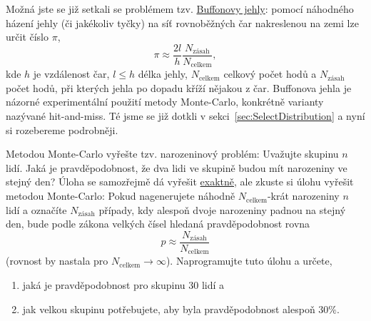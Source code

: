 \documentclass[a4paper,11pt,twoside]{article}
\theoremstyle{red}
\theoremstyle{green}
\begin{document}
    Možná jste se již setkali se problémem tzv. \href{https://cs.wikipedia.org/wiki/Buffonova_jehla}{Buffonovy jehly}: pomocí náhodného házení jehly (či jakékoliv tyčky) na síť rovnoběžných čar nakreslenou na zemi lze určit číslo $\pi$, 
    \begin{equation}
        \pi\approx\frac{2l}{h}\frac{N_{\text{zásah}}}{N_\text{celkem}},
    \end{equation}
    kde $h$ je vzdálenost čar, $l\leq h$ délka jehly, $N_{\text{celkem}}$ celkový počet hodů a $N_{\text{zásah}}$ počet hodů, při kterých jehla po dopadu kříží nějakou z čar.
    Buffonova jehla je názorné experimentální použití metody Monte-Carlo, konkrétně varianty nazývané hit-and-miss.
    Té jsme se již dotkli v sekci~\ref{sec:SelectDistribution} a nyní si rozebereme podrobněji.
    
    \begin{task}
        Metodou Monte-Carlo vyřešte tzv. narozeninový problém: Uvažujte skupinu $n$ lidí. 
        Jaká je pravděpodobnost, že dva lidi ve skupině budou mít narozeniny ve stejný den?
        Úloha se samozřejmě dá vyřešit \href{https://cs.wikipedia.org/wiki/Narozeninov%C3%BD_probl%C3%A9m}{exaktně}, ale zkuste si úlohu vyřešit metodou Monte-Carlo:
        Pokud nagenerujete náhodně $N_{\text{celkem}}$-krát narozeniny $n$ lidí a označíte $N_{\text{zásah}}$ případy, kdy alespoň dvoje narozeniny padnou na stejný den, bude podle zákona velkých čísel hledaná pravděpodobnost rovna
        \begin{equation}
            p\approx\frac{N_{\text{zásah}}}{N_{\text{celkem}}}
        \end{equation}
        (rovnost by nastala pro $N_{\text{celkem}}\rightarrow\infty$).
        Naprogramujte tuto úlohu a určete,
        \begin{enumerate}
            \item jaká je pravděpodobnost pro skupinu $30$ lidí a
            \item jak velkou skupinu potřebujete, aby byla pravděpodobnost alespoň $30\%$.
        \end{enumerate}
    \end{task}
\end{document}
